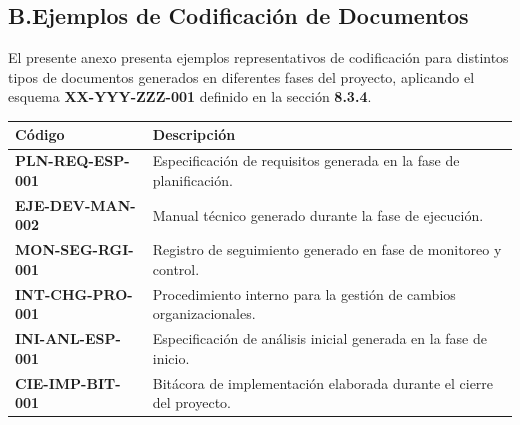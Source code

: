 \documentclass{encabezado}
\begin{document}
\bigskip

\subsection*{B.\enspace Ejemplos de Codificación de Documentos}

El presente anexo presenta ejemplos representativos de codificación para distintos tipos de documentos generados en diferentes fases del proyecto, aplicando el esquema \textbf{XX-YYY-ZZZ-001} definido en la sección \textbf{8.3.4}.

\bigskip

\begin{center}
    \footnotesize
    \renewcommand{\arraystretch}{1.6}
    \begin{tabular}{|>{\centering\arraybackslash}p{3.5cm}|p{9.5cm}|}
        \hline
        \textbf{Código}          & \textbf{Descripción}                                                 \\
        \hline
        \textbf{PLN-REQ-ESP-001} & Especificación de requisitos generada en la fase de planificación.   \\
        \hline
        \textbf{EJE-DEV-MAN-002} & Manual técnico generado durante la fase de ejecución.                \\
        \hline
        \textbf{MON-SEG-RGI-001} & Registro de seguimiento generado en fase de monitoreo y control.     \\
        \hline
        \textbf{INT-CHG-PRO-001} & Procedimiento interno para la gestión de cambios organizacionales.   \\
        \hline
        \textbf{INI-ANL-ESP-001} & Especificación de análisis inicial generada en la fase de inicio.    \\
        \hline
        \textbf{CIE-IMP-BIT-001} & Bitácora de implementación elaborada durante el cierre del proyecto. \\
        \hline
    \end{tabular}
\end{center}
\end{document}
